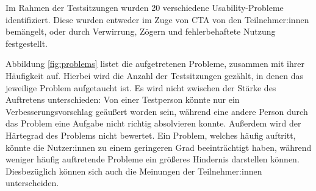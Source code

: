 
\pskip
Im Rahmen der Testsitzungen wurden 20 verschiedene Usability-Probleme identifiziert. Diese wurden entweder im Zuge von \ac{CTA} von den Teilnehmer:innen bemängelt, oder durch Verwirrung, Zögern und fehlerbehaftete Nutzung festgestellt.

Abbildung \ref{fig:problems} listet die aufgetretenen Probleme, zusammen mit ihrer Häufigkeit auf. Hierbei wird die Anzahl der Testsitzungen gezählt, in denen das jeweilige Problem aufgetaucht ist. Es wird nicht zwischen der Stärke des Auftretens unterschieden: Von einer Testperson könnte nur ein Verbesserungsvorschlag geäußert worden sein, während eine andere Person durch das Problem eine Aufgabe nicht richtig absolvieren konnte. Außerdem wird der Härtegrad des Problems nicht bewertet. Ein Problem, welches häufig auftritt, könnte die Nutzer:innen zu einem geringeren Grad beeinträchtigt haben, während weniger häufig auftretende Probleme ein größeres Hindernis darstellen können. Diesbezüglich können sich auch die Meinungen der Teilnehmer:innen unterscheiden.

